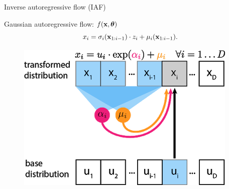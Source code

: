 \begin{frame}{Inverse autoregressive flow (IAF)}
	
	\begin{minipage}[t]{0.65\columnwidth}
		\begin{block}{Gaussian autoregressive flow: $f(\mathbf{x}, \boldsymbol{\theta})$}
			\[
			x_i = \sigma_i (\mathbf{x}_{1:i-1}) \cdot z_i + \mu_i(\mathbf{x}_{1:i-1}).
			\]
		\end{block}
	\end{minipage}%
	\begin{minipage}[t]{0.35\columnwidth}
		\begin{figure}[h]
			\centering
			\includegraphics[width=.9\linewidth]{figs/maf_iaf_explained_1.png}
		\end{figure}
	\end{minipage} \\
	

\end{frame}
